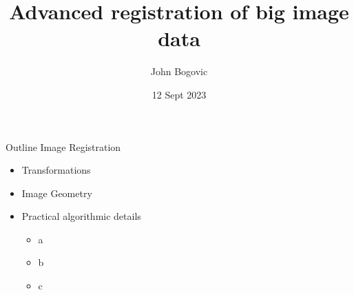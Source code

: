 \documentclass[aspectratio=169]{beamer}
\title[BigWarp]{\LARGE{Advanced registration of big image data} }
\author{John Bogovic}
\date{12 Sept 2023}
\begin{document}

\begin{frame}[plain]
  \titlepage
\end{frame}


\begin{frame}{Outline}
  Image Registration
  \vspace{1.0em}
  \begin{itemize}
      \setlength\itemsep{1.0em}
      \item Transformations
      \item Image Geometry
      \item Practical algorithmic details
      \begin{itemize}
          \setlength\itemsep{0.5em}
          \item a
          \item b
          \item c
      \end{itemize}
  \end{itemize}
\end{frame}
\end{document}
